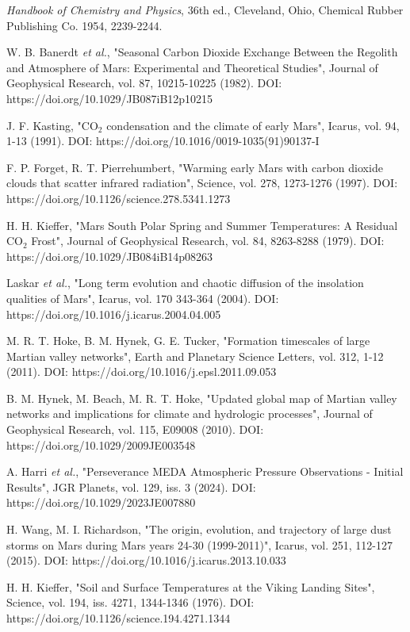\documentclass[12pt,onecolumn]{revtex4-2}    %
\begin{document}
\begin{thebibliography}{}
 \textit{Handbook of Chemistry and Physics}, 36th ed., Cleveland, Ohio, Chemical Rubber Publishing Co. 1954, 2239-2244.

 W. B. Banerdt \textit{et al.}, "Seasonal Carbon Dioxide Exchange Between the Regolith and Atmosphere of Mars: Experimental and Theoretical Studies", Journal of Geophysical Research, vol. 87, 10215-10225 (1982). DOI: https://doi.org/10.1029/JB087iB12p10215

 J. F. Kasting, "$\mathrm{CO_2}$ condensation and the climate of early Mars", Icarus, vol. 94, 1-13 (1991). DOI: https://doi.org/10.1016/0019-1035(91)90137-I

 F. P. Forget, R. T. Pierrehumbert, "Warming early Mars with carbon dioxide clouds that scatter infrared radiation", Science, vol. 278, 1273-1276 (1997). DOI: https://doi.org/10.1126/science.278.5341.1273

 H. H. Kieffer, "Mars South Polar Spring and Summer Temperatures: A Residual $\mathrm{CO_2}$ Frost", Journal of Geophysical Research, vol. 84, 8263-8288 (1979). DOI: https://doi.org/10.1029/JB084iB14p08263

 Laskar \textit{et al.}, "Long term evolution and chaotic diffusion of the insolation qualities of Mars", Icarus, vol. 170 343-364 (2004). DOI: https://doi.org/10.1016/j.icarus.2004.04.005

 M. R. T. Hoke, B. M. Hynek, G. E. Tucker, "Formation timescales of large Martian valley networks", Earth and Planetary Science Letters, vol. 312, 1-12 (2011). DOI: https://doi.org/10.1016/j.epsl.2011.09.053

 B. M. Hynek, M. Beach, M. R. T. Hoke, "Updated global map of Martian valley networks and implications for climate and hydrologic processes", Journal of Geophysical Research, vol. 115, E09008 (2010). DOI: https://doi.org/10.1029/2009JE003548

 A. Harri \textit{et al.}, "Perseverance MEDA Atmospheric Pressure Observations - Initial Results", JGR Planets, vol. 129, iss. 3 (2024). DOI: https://doi.org/10.1029/2023JE007880

 H. Wang, M. I. Richardson, "The origin, evolution, and trajectory of large dust storms on Mars during Mars years 24-30 (1999-2011)", Icarus, vol. 251, 112-127 (2015). DOI: https://doi.org/10.1016/j.icarus.2013.10.033

 H. H. Kieffer, "Soil and Surface Temperatures at the Viking Landing Sites", Science, vol. 194, iss. 4271, 1344-1346 (1976). DOI: https://doi.org/10.1126/science.194.4271.1344


\end{thebibliography}
\end{document}
